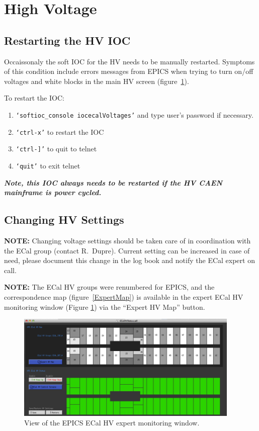 \documentclass[12pt]{article}
\begin{document}
\newpage
   \section{High Voltage}
   \subsection{Restarting the HV IOC}
   Occaissonaly the soft IOC for the HV needs to be manually restarted.  Symptoms of this condition include errors messages from EPICS when trying to turn on/off voltages and white blocks in the main HV screen (figure~\ref{HV}).  
   
   To restart the IOC:
   {\footnotesize
   \begin{enumerate}
       \item \texttt{`softioc\_console iocecalVoltages'} and type user's password if necessary.
       \item \texttt{`ctrl-x'} to restart the IOC
       \item \texttt{`ctrl-]'} to quit to telnet
       \item \texttt{`quit'} to exit telnet
   \end{enumerate}
   }

{\bf\em Note, this IOC always needs to be restarted if the HV CAEN mainframe is power cycled.}
   
   \subsection{Changing HV Settings}
      {\bf NOTE:} Changing voltage settings should be taken care of in coordination with the ECal group (contact R.~Dupre). Current setting can be increased in case of need, please document this change in the log book and notify the ECal expert on call.

 {\bf NOTE:} The ECal HV groups were renumbered for EPICS, and the correspondence map (figure~\ref{ExpertMap}) is available in the expert ECal HV monitoring window (Figure 
 \ref{HV}) via the ``Expert HV Map'' button.

\begin{figure}[htbp]
\center
\includegraphics[width=0.95\textwidth]{pics/ecalhvmongui.png}
\caption{ \label{HV} View of the EPICS ECal HV expert monitoring window.}
\end{figure}
\end{document}

